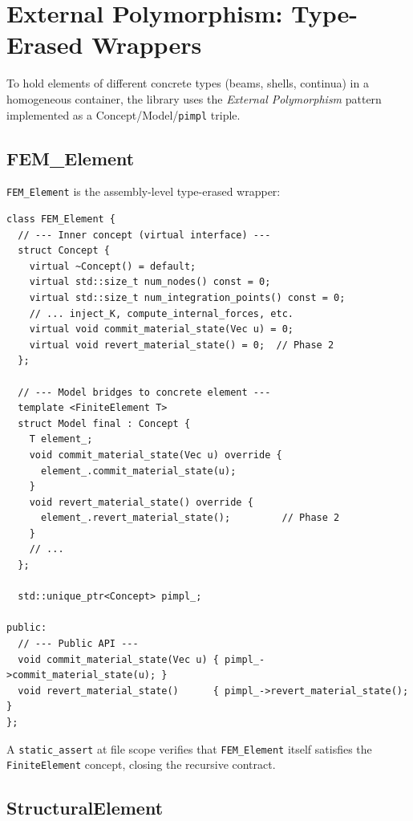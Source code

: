 \section{External Polymorphism: Type-Erased Wrappers}
\label{sec:type-erased-wrappers}

To hold elements of different concrete types (beams, shells, continua)
in a homogeneous container, the library uses the \emph{External
Polymorphism} pattern~\cite{Iglberger2022} implemented as a
Concept/Model/\texttt{pimpl} triple.

\subsection{FEM\_Element}
\label{sec:fem-element}

\texttt{FEM\_Element} is the assembly-level type-erased wrapper:

\begin{lstlisting}[caption={\texttt{FEM\_Element} type-erasure structure},
                   label={lst:fem-element}]
class FEM_Element {
  // --- Inner concept (virtual interface) ---
  struct Concept {
    virtual ~Concept() = default;
    virtual std::size_t num_nodes() const = 0;
    virtual std::size_t num_integration_points() const = 0;
    // ... inject_K, compute_internal_forces, etc.
    virtual void commit_material_state(Vec u) = 0;
    virtual void revert_material_state() = 0;  // Phase 2
  };

  // --- Model bridges to concrete element ---
  template <FiniteElement T>
  struct Model final : Concept {
    T element_;
    void commit_material_state(Vec u) override {
      element_.commit_material_state(u);
    }
    void revert_material_state() override {
      element_.revert_material_state();         // Phase 2
    }
    // ...
  };

  std::unique_ptr<Concept> pimpl_;

public:
  // --- Public API ---
  void commit_material_state(Vec u) { pimpl_->commit_material_state(u); }
  void revert_material_state()      { pimpl_->revert_material_state(); }
};
\end{lstlisting}

A \texttt{static\_assert} at file scope verifies that
\texttt{FEM\_Element} itself satisfies the \texttt{FiniteElement}
concept, closing the recursive contract.

\subsection{StructuralElement}
\label{sec:structural-element}

